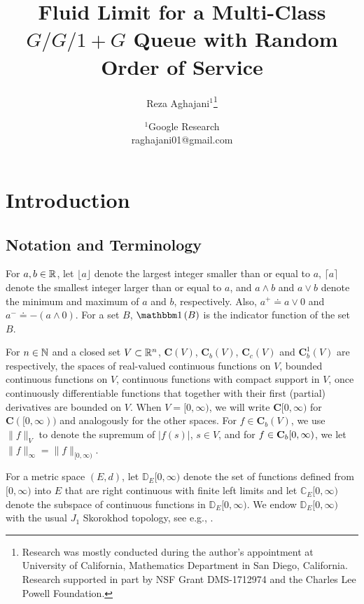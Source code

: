 \documentclass{article}
\title{Fluid Limit for a Multi-Class $G/G/1+G$ Queue with Random Order of Service}
\author{Reza Aghajani$^1$\thanks{ Research was mostly conducted during the author's appointment at University of California, Mathematics Department in San Diego, California. Research supported in part by NSF Grant DMS-1712974 and the Charles Lee Powell Foundation.}}
\date{
	$^1$Google Research \\{\vspace{5mm}} {raghajani01@gmail.com}
}
\numberwithin{equation}{section}
\begin{document}

\maketitle 

\tableofcontents


\section{Introduction}\label{sec_intro}

\subsection{Notation and Terminology} \label{sec_notation}
For $a, b \in \mathbb{R}$, let $\lfloor a\rfloor$ denote the largest integer smaller than or equal to $a$, $\lceil a\rceil$ denote the smallest integer larger than or equal to $a$, and   $a \wedge b$ and $a \vee b$ denote the minimum and maximum of $a$ and $b$, respectively. Also,  $a^+\doteq a\vee 0$ and $a^-\doteq-(a\wedge 0)$. For a set $B$, $\indic{B}$ is the indicator function of the set $B$.

For  $n\in\mathbb{N}$ and  a closed set $V\subset\mathbb{R}^n$, $\mathbf{C}(V)$, $\mathbf{C}_b(V)$, $\mathbf{C}_c(V)$ and $\mathbf{C}^1_b(V)$  are respectively, the spaces of real-valued continuous functions on $V$, bounded continuous functions on $V$,  continuous functions with compact support in $V$, once continuously differentiable functions that together with their first (partial) derivatives are
bounded on $V$. When $V = [0,\infty)$, we will write $\mathbf{C}[0,\infty)$ for $\mathbf{C}([0,\infty))$ and analogously for the other spaces. For $f\in \mathbf{C}_b(V)$, we use $\|f\|_V$ to denote the supremum of $|f(s)|$, $s \in V$, and for $f\in\mathbf{C}_b[0,\infty)$, we let $\|f\|_\infty=\|f\|_{[0,\infty)} $. 

For a metric space $(E, d)$, let $\mathbb D_E[0,\infty)$ denote the set of functions defined from $[0,\infty)$ into $E$ that are right continuous with finite left limits
and let $\mathbb C_E[0,\infty)$ denote the subspace of continuous functions in $\mathbb D_E [0, \infty)$. We endow $\mathbb D_E [0,\infty)$ with the usual $J_1$ Skorokhod topology,
see e.g., \cite{KurtzBook}.

\end{document}

